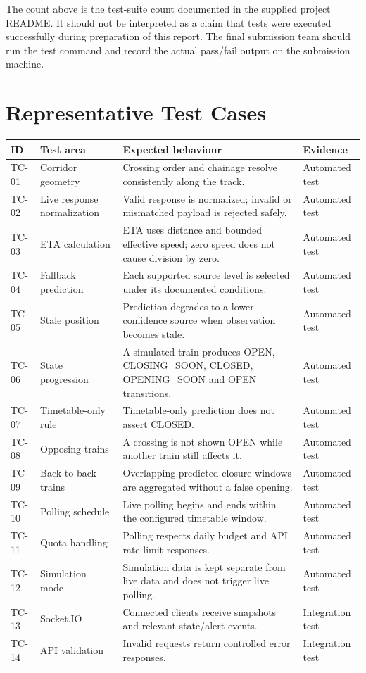 \documentclass[11pt,a4paper]{report}
\begin{document}
The count above is the test-suite count documented in the supplied project README. It should not be interpreted as a claim that tests were executed successfully during preparation of this report. The final submission team should run the test command and record the actual pass/fail output on the submission machine.

\section{Representative Test Cases}
\begin{longtable}{p{1.2cm}p{4.1cm}p{6.8cm}p{1.5cm}}
\toprule
\textbf{ID} & \textbf{Test area} & \textbf{Expected behaviour} & \textbf{Evidence}\\
\midrule
TC-01 & Corridor geometry & Crossing order and chainage resolve consistently along the track. & Automated test\\
TC-02 & Live response normalization & Valid response is normalized; invalid or mismatched payload is rejected safely. & Automated test\\
TC-03 & ETA calculation & ETA uses distance and bounded effective speed; zero speed does not cause division by zero. & Automated test\\
TC-04 & Fallback prediction & Each supported source level is selected under its documented conditions. & Automated test\\
TC-05 & Stale position & Prediction degrades to a lower-confidence source when observation becomes stale. & Automated test\\
TC-06 & State progression & A simulated train produces OPEN, CLOSING\_SOON, CLOSED, OPENING\_SOON and OPEN transitions. & Automated test\\
TC-07 & Timetable-only rule & Timetable-only prediction does not assert CLOSED. & Automated test\\
TC-08 & Opposing trains & A crossing is not shown OPEN while another train still affects it. & Automated test\\
TC-09 & Back-to-back trains & Overlapping predicted closure windows are aggregated without a false opening. & Automated test\\
TC-10 & Polling schedule & Live polling begins and ends within the configured timetable window. & Automated test\\
TC-11 & Quota handling & Polling respects daily budget and API rate-limit responses. & Automated test\\
TC-12 & Simulation mode & Simulation data is kept separate from live data and does not trigger live polling. & Automated test\\
TC-13 & Socket.IO & Connected clients receive snapshots and relevant state/alert events. & Integration test\\
TC-14 & API validation & Invalid requests return controlled error responses. & Integration test\\
\bottomrule
\end{longtable}
\end{document}
